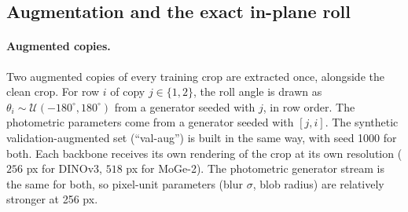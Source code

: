 \begin{table}[t]
  \centering\footnotesize
  \caption{\textbf{Decoder and target ablations} on SPEED+ (no augmentation, greedy, 3-seed mean). Synthetic val selects; lightbox and sunlamp are descriptive.}
  \label{tab:app_lineage}
\end{table}

\subsection{Augmentation and the exact in-plane roll}\label{app:roll}

\paragraph{Augmented copies.}
Two augmented copies of every training crop are extracted once, alongside the clean crop. For row $i$ of copy $j\in\{1,2\}$, the roll angle is drawn as $\theta_i\sim\mathcal{U}(-180^\circ,180^\circ)$ from a generator seeded with $j$, in row order. The photometric parameters come from a generator seeded with $[j,i]$. The synthetic validation-augmented set (``val-aug'') is built in the same way, with seed 1000 for both. Each backbone receives its own rendering of the crop at its own resolution ($256$ px for DINOv3, $518$ px for MoGe-2). The photometric generator stream is the same for both, so pixel-unit parameters (blur $\sigma$, blob radius) are relatively stronger at 256 px.

